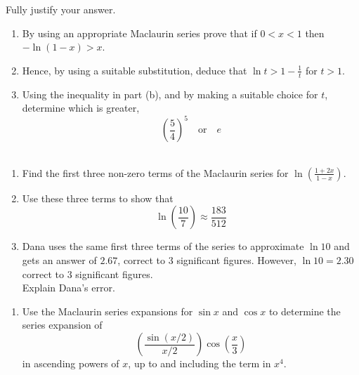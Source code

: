 \documentclass[leqno]{article}
\begin{document}
\begin{enumerate}[
  label=\textbf{\arabic*.},
  leftmargin=*,
  topsep=0pt,
  partopsep=0pt,
  parsep=0pt
]
\begin{enumerate}[label=\textbf{(\alph*)}]
  Fully justify your answer.  \\
\end{enumerate}

\newpage

\questionitem

\begin{enumerate}[label=\textbf{(\alph*)}]
  \item By using an appropriate Maclaurin series prove that if $0 < x < 1$ then $-\ln(1-x) > x$.  \\
  \item Hence, by using a suitable substitution, deduce that $\ln t > 1 - \frac{1}{t}$ for $t > 1$.  \\
  \item Using the inequality in part (b), and by making a suitable choice for $t$, determine which is greater, \[\left(\frac{5}{4}\right)^5 \quad \text{or}\quad e\]  \\
\end{enumerate}

\newpage

\questionitem

\begin{enumerate}[label=\textbf{(\alph*)}]
  \item Find the first three non-zero terms of the Maclaurin series for $\ln\left(\frac{1+2x}{1-x}\right)$.  \\
  \item Use these three terms to show that
  \[
  \ln\left(\dfrac{10}{7}\right) \approx \dfrac{183}{512}
  \]
  \item Dana uses the same first three terms of the series to approximate $\ln 10$ and gets an answer of $2.67$, correct to $3$ significant figures. However, $\ln 10 = 2.30$ correct to $3$ significant figures. \\

  Explain Dana's error.  \\
\end{enumerate}

\newpage

\questionitem

\begin{enumerate}[label=\textbf{(\alph*)}]
  \item Use the Maclaurin series expansions for $\sin x$ and $\cos x$ to determine the series expansion of
  \[
  \left(\frac{\sin(x/2)}{x/2}\right)\cos\left(\frac{x}{3}\right)
  \]
  in ascending powers of $x$, up to and including the term in $x^4$. \\


\end{enumerate}
\end{enumerate}
\end{document}
